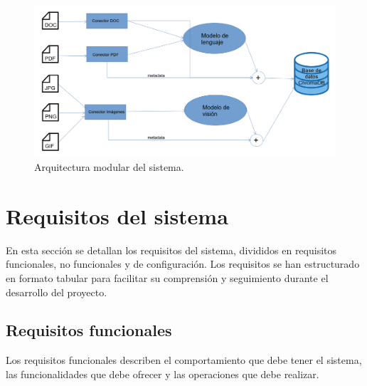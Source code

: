 \begin{figure}[H]
\centering
\includegraphics[width=\textwidth]{archivos/arquitectura_modular.png}
\caption[Arquitectura modular del sistema]{Arquitectura modular del sistema.}
\label{fig:arquitectura_modular}
\end{figure}

\section{Requisitos del sistema}
En esta sección se detallan los requisitos del sistema, divididos en requisitos funcionales, no funcionales y de configuración. Los requisitos se han estructurado en formato tabular para facilitar su comprensión y seguimiento durante el desarrollo del proyecto.

\subsection{Requisitos funcionales}
Los requisitos funcionales describen el comportamiento que debe tener el sistema, las funcionalidades que debe ofrecer y las operaciones que debe realizar.

